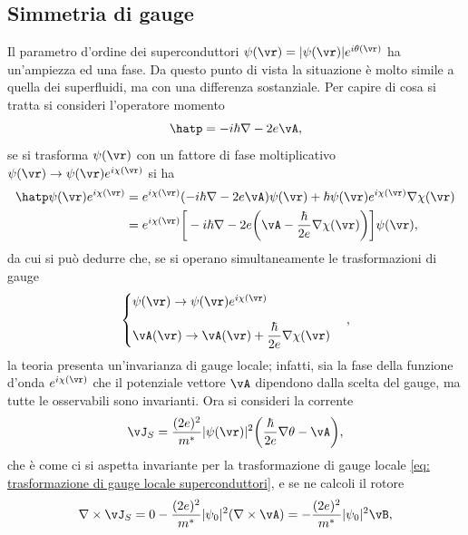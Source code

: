 \subsection{Simmetria di gauge}
Il parametro d'ordine dei superconduttori $\psi(\vr) = |\psi(\vr)|e^{i\theta(\vr)}$ ha un'ampiezza ed una fase. Da questo punto di vista la situazione è molto simile a quella dei superfluidi, ma con una differenza sostanziale. Per capire di cosa si tratta si consideri l'operatore momento 
\begin{equation}
    \hatp = -i\hbar\nabla - 2e\vA,
\end{equation}
se si trasforma $\psi(\vr)$ con un fattore di fase moltiplicativo $\psi(\vr) \to \psi(\vr)e^{i\chi(\vr)}$ si ha 
\begin{equation}
    \begin{split}
        \hatp\psi(\vr)e^{i\chi(\vr)} &= e^{i\chi(\vr)}(-i\hbar\nabla - 2e\vA)\psi(\vr) + \hbar\psi(\vr)e^{i\chi(\vr)}\nabla\chi(\vr) \\
        &= e^{i\chi(\vr)}\bigg[-i\hbar\nabla - 2e\bigg(\vA - \frac{\hbar}{2e}\nabla\chi(\vr)\bigg)\bigg]\psi(\vr),
    \end{split}
\end{equation}
da cui si può dedurre che, se si operano simultaneamente le trasformazioni di gauge
\begin{equation}
\label{eq: trasformazione di gauge locale superconduttori}
    \begin{cases}
        \psi(\vr) \to \psi(\vr)e^{i\chi(\vr)} \\[2ex]
        \vA(\vr) \to \vA(\vr) + \dfrac{\hbar}{2e}\nabla\chi(\vr)
    \end{cases},
\end{equation}
la teoria presenta un'invarianza di gauge locale; infatti, sia la fase della funzione d'onda $e^{i\chi(\vr)}$ che il potenziale vettore $\vA$ dipendono dalla scelta del gauge, ma tutte le osservabili sono invarianti. Ora si consideri la corrente
\begin{equation}
    \vJ_S = \frac{(2e)^2}{m^*}|\psi(\vr)|^2\bigg(\frac{\hbar}{2e}\nabla\theta - \vA\bigg),
\end{equation}
che è come ci si aspetta invariante per la trasformazione di gauge locale \eqref{eq: trasformazione di gauge locale superconduttori}, e se ne calcoli il rotore
\begin{equation}
    \nabla \times \vJ_S = 0 - \frac{(2e)^2}{m^*}|\psi_0|^2(\nabla \times \vA) = -\frac{(2e)^2}{m^*}|\psi_0|^2\vB,
\end{equation}
